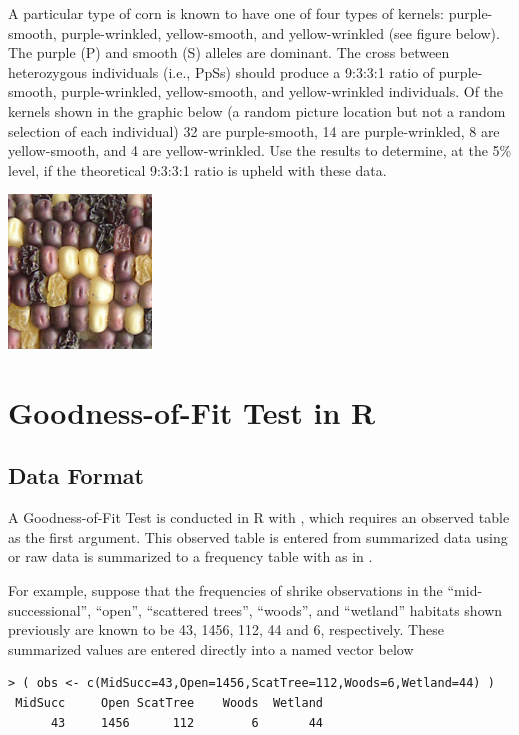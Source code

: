 \documentclass[10pt,openany]{book}\usepackage[]{graphicx}\usepackage[]{color}
\makeatletter
\newenvironment{kframe}{%
 \def\at@end@of@kframe{}%
 \ifinner\ifhmode%
  \def\at@end@of@kframe{\end{minipage}}%
  \begin{minipage}{\columnwidth}%
 \fi\fi%
 \def\FrameCommand##1{\hskip\@totalleftmargin \hskip-\fboxsep
 \colorbox{shadecolor}{##1}\hskip-\fboxsep
     \hskip-\linewidth \hskip-\@totalleftmargin \hskip\columnwidth}%
 \MakeFramed {\advance\hsize-\width
   \@totalleftmargin\z@ \linewidth\hsize
   \@setminipage}}%
 {\par\unskip\endMakeFramed%
 \at@end@of@kframe}
\newenvironment{knitrout}{}{} %
\makeatother
\begin{document}
\begin{exsection}
  \item \label{revex:ChiGOFMendels1} A particular type of corn is known to have one of four types of kernels: purple-smooth, purple-wrinkled, yellow-smooth, and yellow-wrinkled (see figure below).  The purple (P) and smooth (S) alleles are dominant.  The cross between heterozygous individuals (i.e., PpSs) should produce a 9:3:3:1 ratio of purple-smooth, purple-wrinkled, yellow-smooth, and yellow-wrinkled individuals.  Of the kernels shown in the graphic below (a random picture location but not a random selection of each individual) 32 are purple-smooth, 14 are purple-wrinkled, 8 are yellow-smooth, and 4 are yellow-wrinkled.  Use the results to determine, at the 5\% level, if the theoretical 9:3:3:1 ratio is upheld with these data. 
    \begin{center}
      \includegraphics[width=1.5in]{Figs/ChiGOF_corn.jpg}
    \end{center}
\end{exsection}

\section{Goodness-of-Fit Test in R}
\vspace{-12pt}
\subsection{Data Format}
\vspace{-12pt}
A Goodness-of-Fit Test is conducted in R with , which requires an observed table as the first argument.  This observed table is entered from summarized data using  or raw data is summarized to a frequency table with  as in .

For example, suppose that the frequencies of shrike observations in the ``mid-successional'', ``open'', ``scattered trees'', ``woods'', and ``wetland'' habitats shown previously are known to be 43, 1456, 112, 44 and 6, respectively.  These summarized values are entered directly into a named vector below
\begin{knitrout}
\color{fgcolor}\begin{kframe}
\begin{verbatim}
> ( obs <- c(MidSucc=43,Open=1456,ScatTree=112,Woods=6,Wetland=44) )
 MidSucc     Open ScatTree    Woods  Wetland 
      43     1456      112        6       44 
\end{verbatim}
\end{kframe}
\end{knitrout}
\end{document}
